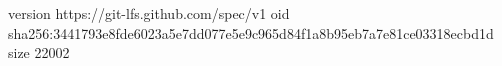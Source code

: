 version https://git-lfs.github.com/spec/v1
oid sha256:3441793e8fde6023a5e7dd077e5e9c965d84f1a8b95eb7a7e81ce03318ecbd1d
size 22002
